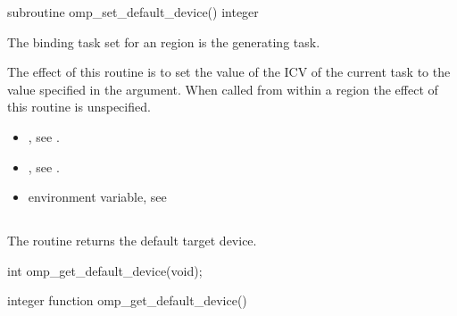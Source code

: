 \begin{fortranspecific}
\begin{boxedcode}
subroutine omp\_set\_default\_device()
integer 
\end{boxedcode}
\end{fortranspecific}

\binding
The binding task set for an  region is the generating 
task.

\effect
The effect of this routine is to set the value of the  ICV of the current 
task to the value specified in the argument. When called from within a  region 
the effect of this routine is unspecified.

\crossreferences
\begin{itemize}
\item {}, see 
.

\item {}, see 
.

\item {} environment variable, see 
\end{itemize}










\subsection{}
\label{subsec:omp_get_default_device}
\summary
The  routine returns the default target device.

\format
\begin{ccppspecific}
\begin{boxedcode}
int omp\_get\_default\_device(void);
\end{boxedcode}
\end{ccppspecific}

\begin{fortranspecific}
\begin{boxedcode}
integer function omp\_get\_default\_device()
\end{boxedcode}
\end{fortranspecific}

